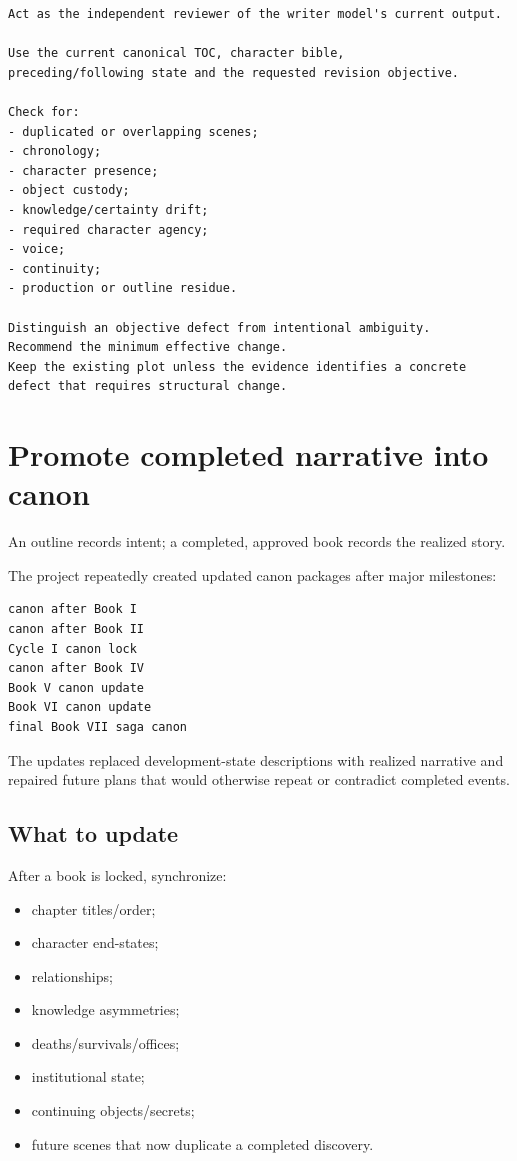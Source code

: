 \documentclass[11pt,oneside,openany]{book}
\providecommand{\tightlist}{%
  \setlength{\itemsep}{0pt}\setlength{\parskip}{0pt}}
\begin{document}
\begin{lstlisting}
Act as the independent reviewer of the writer model's current output.

Use the current canonical TOC, character bible,
preceding/following state and the requested revision objective.

Check for:
- duplicated or overlapping scenes;
- chronology;
- character presence;
- object custody;
- knowledge/certainty drift;
- required character agency;
- voice;
- continuity;
- production or outline residue.

Distinguish an objective defect from intentional ambiguity.
Recommend the minimum effective change.
Keep the existing plot unless the evidence identifies a concrete defect that requires structural change.
\end{lstlisting}

\chapter{Promote completed narrative into canon}\label{promote-completed-narrative-into-canon}

An outline records intent; a completed, approved book records the realized story.

The project repeatedly created updated canon packages after major milestones:

\begin{lstlisting}
canon after Book I
canon after Book II
Cycle I canon lock
canon after Book IV
Book V canon update
Book VI canon update
final Book VII saga canon
\end{lstlisting}

The updates replaced development-state descriptions with realized narrative and repaired future plans that would otherwise repeat or contradict completed events.

\section{What to update}\label{what-to-update}

After a book is locked, synchronize:

\begin{itemize}
\tightlist
\item
  chapter titles/order;
\item
  character end-states;
\item
  relationships;
\item
  knowledge asymmetries;
\item
  deaths/survivals/offices;
\item
  institutional state;
\item
  continuing objects/secrets;
\item
  future scenes that now duplicate a completed discovery.
\end{itemize}
\end{document}
